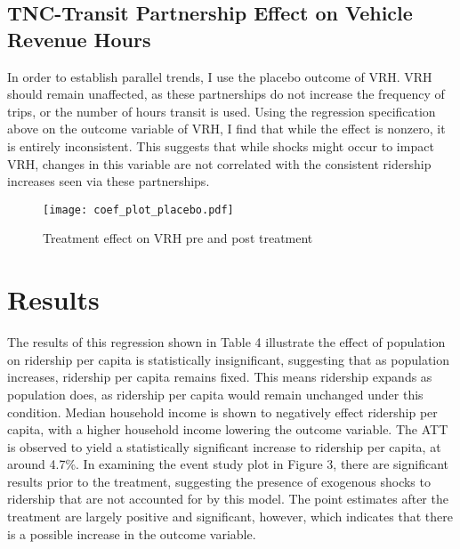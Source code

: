 \documentclass [12pt]{report}
\begin{document}
\subsection*{TNC-Transit Partnership Effect on Vehicle Revenue Hours}

In order to establish parallel trends, I use the placebo outcome of VRH. VRH should remain unaffected, as these partnerships do not increase the frequency of trips, or the number of hours transit is used. Using the regression specification above on the outcome variable of VRH, I find that while the effect is nonzero, it is entirely inconsistent. This suggests that while shocks might occur to impact VRH, changes in this variable are not correlated with the consistent ridership increases seen via these partnerships.


\begin{figure}[H]
    \centering
    \texttt{[image: coef\_plot\_placebo.pdf]} %
    \caption{Treatment effect on VRH pre and post treatment}
\end{figure}


\section*{Results}
The results of this regression shown in Table 4 illustrate the effect of population on ridership per capita is statistically insignificant, suggesting that as population increases, ridership per capita remains fixed. This means ridership expands as population does, as ridership per capita would remain unchanged under this condition. Median household income is shown to negatively effect ridership per capita, with a higher household income lowering the outcome variable. The ATT is observed to yield a statistically significant increase to ridership per capita, at around 4.7\%. In examining the event study plot in Figure 3, there are significant results prior to the treatment, suggesting the presence of exogenous shocks to ridership that are not accounted for by this model. The point estimates after the treatment are largely positive and significant, however, which indicates that there is a possible increase in the outcome variable.\\
\end{document}
